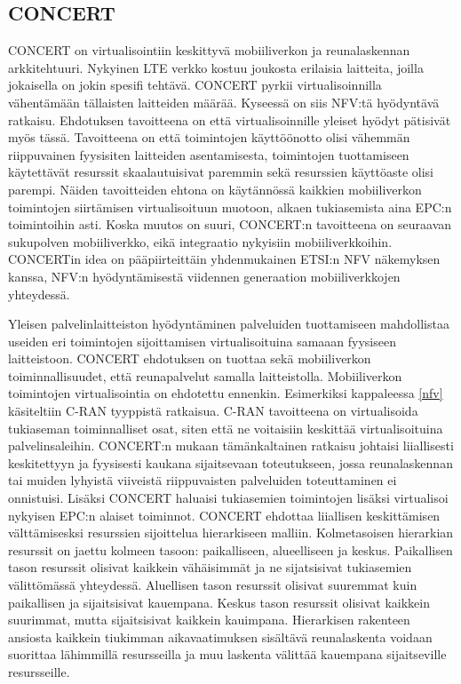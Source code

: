 \subsection{CONCERT} \label{concert}
CONCERT \cite{liu2014concert} on virtualisointiin keskittyvä mobiiliverkon ja reunalaskennan arkkitehtuuri.
Nykyinen LTE verkko kostuu joukosta erilaisia laitteita, joilla jokaisella on jokin spesifi tehtävä.
CONCERT pyrkii virtualisoinnilla vähentämään tällaisten laitteiden määrää.
Kyseessä on siis NFV:tä hyödyntävä ratkaisu.
Ehdotuksen tavoitteena on että virtualisoinnille yleiset hyödyt pätisivät myös tässä.
Tavoitteena on että toimintojen käyttöönotto olisi vähemmän riippuvainen fyysisiten laitteiden asentamisesta, toimintojen tuottamiseen käytettävät resurssit skaalautuisivat paremmin sekä resurssien käyttöaste olisi parempi.
Näiden tavoitteiden ehtona on käytännössä kaikkien mobiiliverkon toimintojen siirtämisen virtualisoituun muotoon, alkaen tukiasemista aina EPC:n toimintoihin asti.
Koska muutos on suuri, CONCERT:n tavoitteena on seuraavan sukupolven mobiiliverkko, eikä integraatio nykyisiin mobiiliverkkoihin.
CONCERTin idea on pääpiirteittäin yhdenmukainen ETSI:n NFV näkemyksen \cite{etsinfv5g} kanssa, NFV:n hyödyntämisestä viidennen generaation mobiiliverkkojen yhteydessä.

Yleisen palvelinlaitteiston hyödyntäminen palveluiden tuottamiseen mahdollistaa useiden eri toimintojen sijoittamisen virtualisoituina samaaan fyysiseen laitteistoon.
CONCERT ehdotuksen on tuottaa sekä mobiiliverkon toiminnallisuudet, että reunapalvelut samalla laitteistolla. 
Mobiiliverkon toimintojen virtualisointia on ehdotettu ennenkin. Esimerkiksi kappaleessa \ref{nfv} käsiteltiin C-RAN tyyppistä ratkaisua. C-RAN tavoitteena on virtualisoida tukiaseman toiminnalliset osat, siten että ne voitaisiin keskittää virtualisoituina palvelinsaleihin. 
CONCERT:n mukaan tämänkaltainen ratkaisu johtaisi liiallisesti keskitettyyn ja fyysisesti kaukana sijaitsevaan toteutukseen, jossa reunalaskennan tai muiden lyhyistä viiveistä riippuvaisten palveluiden toteuttaminen ei onnistuisi. Lisäksi CONCERT haluaisi tukiasemien toimintojen lisäksi virtualisoi nykyisen EPC:n alaiset toiminnot.
CONCERT ehdottaa liiallisen keskittämisen välttämisesksi resurssien sijoittelua hierarkiseen malliin.
Kolmetasoisen hierarkian resurssit on jaettu kolmeen tasoon: paikalliseen, alueelliseen ja keskus. 
Paikallisen tason resurssit olisivat kaikkein vähäisimmät ja ne sijatsisivat tukiasemien välittömässä yhteydessä.
Aluellisen tason resurssit olisivat suuremmat kuin paikallisen ja sijaitsisivat kauempana.
Keskus tason resurssit olisivat kaikkein suurimmat, mutta sijaitsisivat kaikkein kauimpana. 
Hierarkisen rakenteen ansiosta kaikkein tiukimman aikavaatimuksen sisältävä reunalaskenta voidaan suorittaa lähimmillä resursseilla ja muu laskenta välittää kauempana sijaitseville resursseille.

